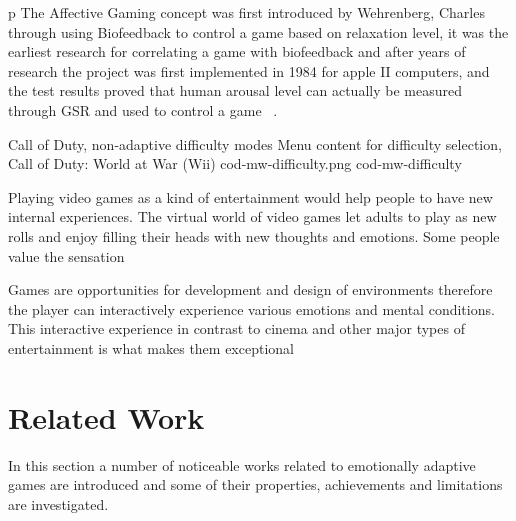 p The Affective Gaming concept was first introduced by Wehrenberg, Charles through using Biofeedback to control a game based on relaxation level, it was the earliest research for correlating a game with biofeedback and after years of research the project was first implemented in 1984 for apple II computers, and the test results proved that human arousal level can actually be measured through GSR and used to control a game  ~\cite{wehrenberg1995willball}.

\img
{Call of Duty, non-adaptive difficulty modes}
{Menu content for difficulty selection, Call of Duty: World at War (Wii)}
{cod-mw-difficulty.png}
{cod-mw-difficulty}

Playing video games as a kind of entertainment would help people to have new internal
experiences. The virtual world of video games let adults to play as new rolls and enjoy filling
their heads with new thoughts and emotions. Some people value
the sensation

Games are opportunities for development and design of environments therefore
the player can interactively experience various emotions and mental conditions.
This interactive experience in contrast to cinema
and other major types of entertainment is what makes them exceptional


\section{Related Work}

In this section a number of noticeable works related to emotionally adaptive games are introduced and some of their properties, achievements and limitations are investigated.


